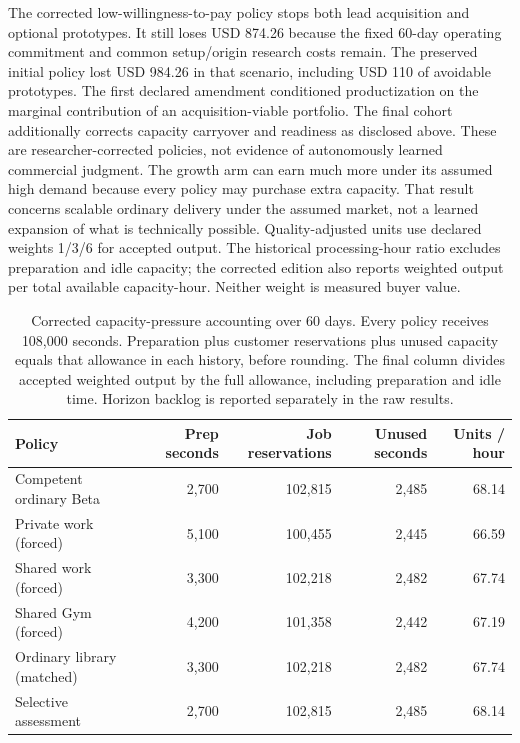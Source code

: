 
The corrected low-willingness-to-pay policy stops both lead acquisition and optional prototypes. It still loses USD 874.26 because the fixed 60-day operating commitment and common setup/origin research costs remain. The preserved initial policy lost USD 984.26 in that scenario, including USD 110 of avoidable prototypes. The first declared amendment conditioned productization on the marginal contribution of an acquisition-viable portfolio. The final cohort additionally corrects capacity carryover and readiness as disclosed above. These are researcher-corrected policies, not evidence of autonomously learned commercial judgment. The growth arm can earn much more under its assumed high demand because every policy may purchase extra capacity. That result concerns scalable ordinary delivery under the assumed market, not a learned expansion of what is technically possible. Quality-adjusted units use declared weights 1/3/6 for accepted output. The historical processing-hour ratio excludes preparation and idle capacity; the corrected edition also reports weighted output per total available capacity-hour. Neither weight is measured buyer value.

\begin{table}[htbp]\centering\footnotesize\begin{tabularx}{\linewidth}{Yrrrr}\toprule

Policy & Prep seconds & Job reservations & Unused seconds & Units / hour\\\midrule

Competent ordinary Beta & 2,700 & 102,815 & 2,485 & 68.14\\

Private work (forced) & 5,100 & 100,455 & 2,445 & 66.59\\

Shared work (forced) & 3,300 & 102,218 & 2,482 & 67.74\\

Shared Gym (forced) & 4,200 & 101,358 & 2,442 & 67.19\\

Ordinary library (matched) & 3,300 & 102,218 & 2,482 & 67.74\\

Selective assessment & 2,700 & 102,815 & 2,485 & 68.14\\

\bottomrule\end{tabularx}\caption{Corrected capacity-pressure accounting over 60 days. Every policy receives 108,000 seconds. Preparation plus customer reservations plus unused capacity equals that allowance in each history, before rounding. The final column divides accepted weighted output by the full allowance, including preparation and idle time. Horizon backlog is reported separately in the raw results.}\end{table}

